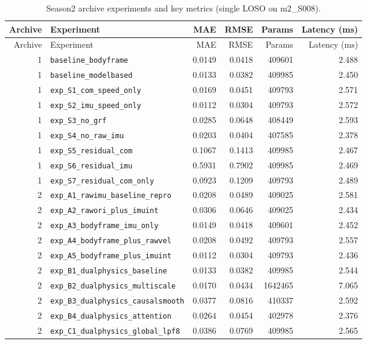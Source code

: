 \begin{longtable}{r l r r r r}
\caption{Season2 archive experiments and key metrics (single LOSO on m2\_S008).}\\
\toprule
Archive & Experiment & MAE & RMSE & Params & Latency (ms) \\
\midrule
\endfirsthead
\toprule
Archive & Experiment & MAE & RMSE & Params & Latency (ms) \\
\midrule
\endhead
1 & \texttt{baseline\_bodyframe} & 0.0149 & 0.0418 & 409601 & 2.488 \\
1 & \texttt{baseline\_modelbased} & 0.0133 & 0.0382 & 409985 & 2.450 \\
1 & \texttt{exp\_S1\_com\_speed\_only} & 0.0169 & 0.0451 & 409793 & 2.571 \\
1 & \texttt{exp\_S2\_imu\_speed\_only} & 0.0112 & 0.0304 & 409793 & 2.572 \\
1 & \texttt{exp\_S3\_no\_grf} & 0.0285 & 0.0648 & 408449 & 2.593 \\
1 & \texttt{exp\_S4\_no\_raw\_imu} & 0.0203 & 0.0404 & 407585 & 2.378 \\
1 & \texttt{exp\_S5\_residual\_com} & 0.1067 & 0.1413 & 409985 & 2.467 \\
1 & \texttt{exp\_S6\_residual\_imu} & 0.5931 & 0.7902 & 409985 & 2.469 \\
1 & \texttt{exp\_S7\_residual\_com\_only} & 0.0923 & 0.1209 & 409793 & 2.489 \\
2 & \texttt{exp\_A1\_rawimu\_baseline\_repro} & 0.0208 & 0.0489 & 409025 & 2.581 \\
2 & \texttt{exp\_A2\_rawori\_plus\_imuint} & 0.0306 & 0.0646 & 409025 & 2.434 \\
2 & \texttt{exp\_A3\_bodyframe\_imu\_only} & 0.0149 & 0.0418 & 409601 & 2.452 \\
2 & \texttt{exp\_A4\_bodyframe\_plus\_rawvel} & 0.0208 & 0.0492 & 409793 & 2.557 \\
2 & \texttt{exp\_A5\_bodyframe\_plus\_imuint} & 0.0112 & 0.0304 & 409793 & 2.436 \\
2 & \texttt{exp\_B1\_dualphysics\_baseline} & 0.0133 & 0.0382 & 409985 & 2.544 \\
2 & \texttt{exp\_B2\_dualphysics\_multiscale} & 0.0170 & 0.0434 & 1642465 & 7.065 \\
2 & \texttt{exp\_B3\_dualphysics\_causalsmooth} & 0.0377 & 0.0816 & 410337 & 2.592 \\
2 & \texttt{exp\_B4\_dualphysics\_attention} & 0.0264 & 0.0454 & 402978 & 2.376 \\
2 & \texttt{exp\_C1\_dualphysics\_global\_lpf8} & 0.0386 & 0.0769 & 409985 & 2.565 \\

\end{longtable}
